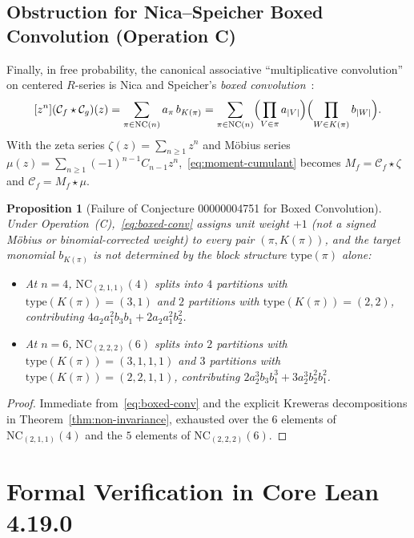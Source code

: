 \documentclass[11pt]{article}
\newtheorem{proposition}[theorem]{Proposition}
\theoremstyle{definition}
\newcommand{\NC}{\mathrm{NC}}
\newcommand{\boxconv}{\mathbin{\star}}
\newcommand{\btype}{\mathrm{type}}
\newcommand{\Krew}{K}
\begin{document}
\subsection{Obstruction for Nica--Speicher Boxed Convolution (Operation C)}
Finally, in free probability, the canonical associative ``multiplicative convolution'' on centered $R$-series is Nica and Speicher's \emph{boxed convolution}~\cite[Lecture~16]{NicaSpeicher2006}:
\begin{equation}\label{eq:boxed-conv}
  [z^n](\mathcal{C}_f \boxconv \mathcal{C}_g)(z)
  = \sum_{\pi \in \NC(n)} a_\pi\,b_{\Krew(\pi)}
  = \sum_{\pi \in \NC(n)} \Bigl(\prod_{V \in \pi} a_{|V|}\Bigr)\Bigl(\prod_{W \in \Krew(\pi)} b_{|W|}\Bigr).
\end{equation}
With the zeta series $\zeta(z) = \sum_{n \ge 1} z^n$ and M\"obius series $\mu(z) = \sum_{n \ge 1} (-1)^{n-1} C_{n-1} z^n$,~\eqref{eq:moment-cumulant} becomes $M_f = \mathcal{C}_f \boxconv \zeta$ and $\mathcal{C}_f = M_f \boxconv \mu$.

\begin{proposition}[Failure of Conjecture 00000004751 for Boxed Convolution]\label{prop:opC}
Under Operation~(C),~\eqref{eq:boxed-conv} assigns unit weight $+1$ (not a signed M\"obius or binomial-corrected weight) to every pair $(\pi, \Krew(\pi))$, and the target monomial $b_{\Krew(\pi)}$ is not determined by the block structure $\btype(\pi)$ alone:
\begin{itemize}
  \item At $n = 4$, $\NC_{(2,1,1)}(4)$ splits into $4$ partitions with $\btype(\Krew(\pi)) = (3,1)$ and $2$ partitions with $\btype(\Krew(\pi)) = (2,2)$, contributing $4 a_2 a_1^2 b_3 b_1 + 2 a_2 a_1^2 b_2^2$.
  \item At $n = 6$, $\NC_{(2,2,2)}(6)$ splits into $2$ partitions with $\btype(\Krew(\pi)) = (3,1,1,1)$ and $3$ partitions with $\btype(\Krew(\pi)) = (2,2,1,1)$, contributing $2 a_2^3 b_3 b_1^3 + 3 a_2^3 b_2^2 b_1^2$.
\end{itemize}
\end{proposition}
\begin{proof}
Immediate from~\eqref{eq:boxed-conv} and the explicit Kreweras decompositions in Theorem~\ref{thm:non-invariance}, exhausted over the $6$ elements of $\NC_{(2,1,1)}(4)$ and the $5$ elements of $\NC_{(2,2,2)}(6)$.
\end{proof}

\section{Formal Verification in Core Lean 4.19.0}
\end{document}
